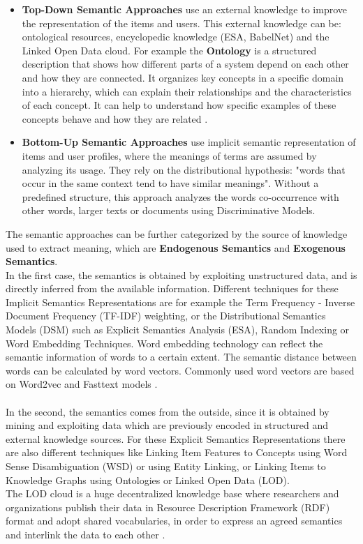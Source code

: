 \documentclass[\myFontSize,oneside,english,hidelinks,a4paper]{article}
\begin{document}
\begin{itemize}
\item \textbf{Top-Down Semantic Approaches} use an external knowledge to improve the representation of the items and users. This external knowledge can be: ontological resources, encyclopedic knowledge (ESA, BabelNet) and the Linked Open Data cloud. For example the \textbf{Ontology} is a structured description that shows how different parts of a system depend on each other and how they are connected. It organizes key concepts in a specific domain into a hierarchy, which can explain their relationships and the characteristics of each concept. It can help to understand how specific examples of these concepts behave and how they are related \cite{pub.1090632691}.
%
\item \textbf{Bottom-Up Semantic Approaches} use implicit semantic representation of items and user profiles, where the meanings of terms are assumed by analyzing its usage. They rely on the distributional hypothesis: "words that occur in the same context tend to have similar meanings". Without a predefined structure, this approach analyzes the words co-occurrence with other words, larger texts or documents using Discriminative Models.\cite{DeGemmis2015119}\\
\end{itemize}
%
%
The semantic approaches can be further categorized by the source of knowledge used to extract meaning, which are \textbf{Endogenous Semantics} and \textbf{Exogenous Semantics}.\\
In the first case, the semantics is obtained by exploiting unstructured data, and is directly inferred from the available information. Different techniques for these Implicit Semantics Representations are for example the Term Frequency - Inverse Document Frequency (TF-IDF) weighting, or the Distributional Semantics Models (DSM) such as Explicit Semantics Analysis (ESA), Random Indexing or Word Embedding Techniques.
Word embedding technology can reflect the semantic information of words to a certain extent. The semantic distance between words can be calculated by word vectors. Commonly used word vectors are based on Word2vec and Fasttext models \cite{Huang2023}.\\\\
%
In the second, the semantics comes from the outside, since it is obtained by mining and exploiting data
which are previously encoded in structured and external knowledge sources. For these Explicit Semantics Representations there are also different techniques like Linking Item Features to Concepts using Word Sense Disambiguation (WSD) or using Entity Linking, or Linking Items to Knowledge Graphs using Ontologies or Linked Open Data (LOD). \cite{Musto2022251} \\
The LOD cloud is a huge decentralized knowledge base where researchers and organizations publish their data in Resource Description Framework (RDF) format and adopt shared vocabularies, in order to express an agreed semantics and interlink the data to each other \cite{Musto2017405}.\\
%
%
%
\end{document}

